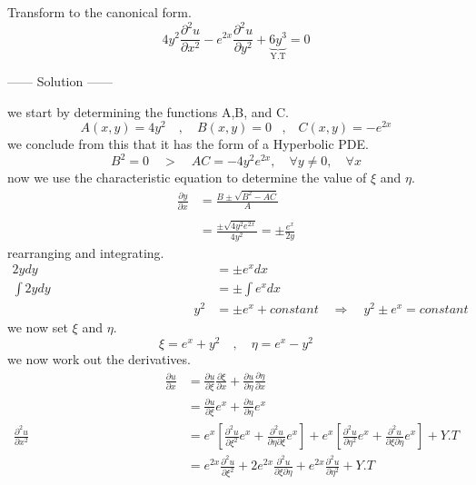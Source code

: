 \documentclass[]{article}
\begin{document}
\begin{example}
    Transform to the canonical form.
    \[
        4y^2\frac{\partial^2 u}{\partial x^2}-e^{2x}\frac{\partial^2 u}{\partial y^2}+\underbrace{6y^3}_{\text{Y.T}} = 0    
    \]
    \begin{center}
        ------ \textcolor{Solution}{Solution} ------ 
    \end{center}
    we start by determining the functions A,B, and C.
    \[
        A\left(x,y\right)=4y^2 \quad,\quad B\left(x,y\right)=0 \;\;\;,\;\;\; C\left(x,y\right)=-e^{2x}    
    \]
    we conclude from this that it has the form of a Hyperbolic PDE.
    \[
        B^2 =0 \quad>\quad AC=-4y^2e^{2x}, \quad \forall y\neq0,\quad \forall x    
    \]
    now we use the characteristic equation to determine the value of $\xi$ and $\eta$.
    \begin{align*}
        \frac{\partial y}{\partial x} &= \frac{B\pm\sqrt{B^2 -AC}}{A}\\
        \\
        &= \frac{\pm\sqrt{4y^2 e^{2x}}}{4y^2}=\pm\frac{e^x}{2y}
    \end{align*}
    rearranging and integrating.
    \begin{align*}
        2ydy &= \pm e^x dx
        \\
        \int 2ydy &= \pm \int e^x dx
        \\ \hspace{6cm}
        y^2 &= \pm e^x + constant \quad \Longrightarrow \quad y^2 \pm e^x = constant 
    \end{align*}
    we now set $\xi$ and $\eta$.
    \[
        \xi = e^x + y^2 \quad , \quad \eta = e^x - y^2    
    \]
    we now work out the derivatives.
    \begin{align*}
        \hspace{5cm}
        \frac{\partial u}{\partial x} &= \frac{\partial u}{\partial\xi}\frac{\partial\xi}{\partial x} + \frac{\partial u }{\partial\eta}\frac{\partial\eta}{\partial x}
        \\
        &= \frac{\partial u}{\partial\xi}e^x+\frac{\partial u}{\partial\eta}e^x
        \\
        \frac{\partial^2 u}{\partial x^2} &= e^x\left[\frac{\partial^2 u}{\partial\xi^2} e^x + \frac{\partial^2 u}{\partial\eta\partial\xi}e^x\right]+e^x\left[\frac{\partial^2 u}{\partial\eta^2} e^x + \frac{\partial^2 u}{\partial\xi\partial\eta}e^x\right]+Y.T
        \\
        &= e^{2x}\frac{\partial^2 u}{\partial\xi^2}+2e^{2x}\frac{\partial^2 u}{\partial\xi\partial\eta}+e^{2x}\frac{\partial^2 u}{\partial\eta^2}+Y.T

\end{align*}
\end{example}
\end{document}

